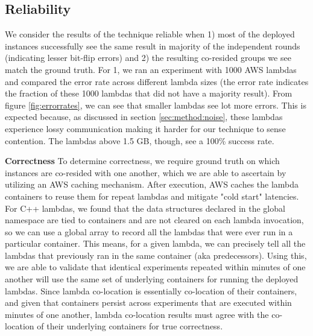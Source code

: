 \subsection{Reliability}
We consider the results of the technique reliable when 1) most of the deployed
instances successfully see the same result in majority of the independent rounds
(indicating lesser bit-flip errors) and 2) the resulting co-resided groups we
see match the ground truth.  For 1, we ran an experiment with 1000 AWS lambdas
and compared the error rate across different lambda sizes (the error rate
indicates the fraction of these 1000 lambdas that did not have a majority
result). From figure \ref{fig:errorrates}, we can see that smaller lambdas see
lot more errors. This is expected because, as discussed in section
\ref{sec:method:noise}, these lambdas experience lossy communication making it
harder for our technique to sense contention. The lambdas above 1.5 GB, though,
see a 100\% success rate.   

\textbf{Correctness} 
To determine correctness, we require ground truth on which instances are
co-resided with one another, which we are able to ascertain by utilizing an AWS
caching mechanism. After execution, AWS caches the lambda containers to reuse 
them\cite{awscontainerreuse} for repeat lambdas and mitigate
"cold start" latencies. For C++ lambdas, we found that the data structures
declared in the global namespace are tied to containers and are not cleared on
each lambda invocation, so we can use a global array to record all the lambdas
that were ever run in a particular container. This means, for a given lambda, we
can precisely tell all the lambdas that previously ran in the same container
(aka predecessors).  Using this, we are able to validate that identical
experiments repeated within minutes of one another will use the same set of
underlying containers for running the deployed lambdas. Since lambda co-location
is essentially co-location of their containers, and given that containers
persist across experiments that are executed within minutes of one another,
lambda co-location results must agree with the co-location of their underlying
containers for true correctness.


